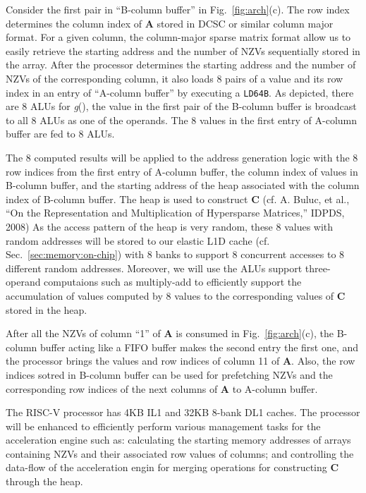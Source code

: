 Consider the first pair in ``B-column buffer'' in Fig.~\ref{fig:arch}(c).
The row index determines the column index of \textbf{A} stored in DCSC or similar column major format.
For a given column, the column-major sparse matrix format allow us to easily retrieve the starting address and the number of NZVs sequentially stored in the array. 
After the processor determines the starting address and the number of NZVs of the corresponding column, 
it also loads 8 pairs of a value and its row index in an entry of ``A-column buffer'' by executing a \texttt{LD64B}.
As depicted, there are 8 ALUs for \textit{g}(), the value in the first pair of the B-column buffer is broadcast to all 8 ALUs as one of the operands.
The 8 values in the first entry of A-column buffer are fed to 8 ALUs.


The 8 computed results will be applied to the address generation logic with the 8 row indices from the first entry of A-column buffer,
the column index of values in B-column buffer, and the starting address of the heap associated with the column index of B-column buffer.
The heap is used to construct \textbf{C} (cf. A. Buluc, et al., ``On the Representation and Multiplication of Hypersparse Matrices,'' IDPDS, 2008)
As the access pattern of the heap is very random, these 8 values with random addresses will be stored to our elastic L1D cache (cf. Sec.~\ref{sec:memory:on-chip}) with 8 banks to support 8 concurrent accesses to 8 different random addresses.
Moreover, we will use the ALUs support three-operand computaions such as multiply-add to efficiently support the accumulation of values computed by 8 values to the corresponding values of \textbf{C} stored in the heap.


After all the NZVs of column ``1'' of \textbf{A} is consumed in Fig.~\ref{fig:arch}(c), 
the B-column buffer acting like a FIFO buffer makes the second entry the first one, and the processor brings the values and row indices of column 11 of \textbf{A}. 
Also, the row indices sotred in B-column buffer can be used for prefetching NZVs and the corresponding row indices of the next columns of \textbf{A} to A-column buffer.


The RISC-V processor has 4KB IL1 and 32KB 8-bank DL1 caches.
The processor will be enhanced to efficiently perform various management tasks for the acceleration engine such as:
calculating the starting memory addresses of arrays containing NZVs and their associated row values of columns; and
controlling the data-flow of the acceleration engin for merging operations for constructing \textbf{C} through the heap.
 

